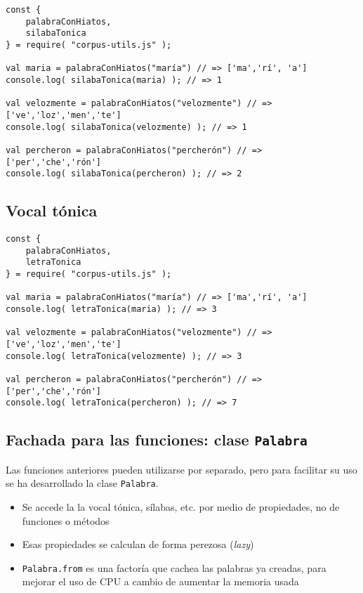 \documentclass[11pt]{article}
\begin{document}
\lstset{language=typescript,label= ,caption= ,captionpos=b,numbers=none}
\begin{lstlisting}
const {
    palabraConHiatos,
    silabaTonica
} = require( "corpus-utils.js" );

val maria = palabraConHiatos("maría") // => ['ma','rí', 'a']
console.log( silabaTonica(maria) ); // => 1

val velozmente = palabraConHiatos("velozmente") // => ['ve','loz','men','te']
console.log( silabaTonica(velozmente) ); // => 1

val percheron = palabraConHiatos("percherón") // => ['per','che','rón']
console.log( silabaTonica(percheron) ); // => 2
\end{lstlisting}


\subsection{\label{vocal-tonica}Vocal tónica}
\label{sec:org0000027}
\lstset{language=typescript,label= ,caption= ,captionpos=b,numbers=none}
\begin{lstlisting}
const {
    palabraConHiatos,
    letraTonica
} = require( "corpus-utils.js" );

val maria = palabraConHiatos("maría") // => ['ma','rí', 'a']
console.log( letraTonica(maria) ); // => 3

val velozmente = palabraConHiatos("velozmente") // => ['ve','loz','men','te']
console.log( letraTonica(velozmente) ); // => 3

val percheron = palabraConHiatos("percherón") // => ['per','che','rón']
console.log( letraTonica(percheron) ); // => 7
\end{lstlisting}

\subsection{Fachada para las funciones: clase \texttt{Palabra}}
\label{sec:org000002a}
Las funciones anteriores pueden utilizarse por separado, pero para facilitar su uso se ha desarrollado la clase \texttt{Palabra}.
\begin{itemize}
\item Se accede la la vocal tónica, sílabas, etc. por medio de propiedades, no de funciones o métodos
\item Esas propiedades se calculan de forma perezosa (\emph{lazy})
\item \texttt{Palabra.from} es una factoría que cachea las palabras ya creadas, para mejorar el uso de CPU a cambio de aumentar la memoria usada
\end{itemize}
\end{document}
